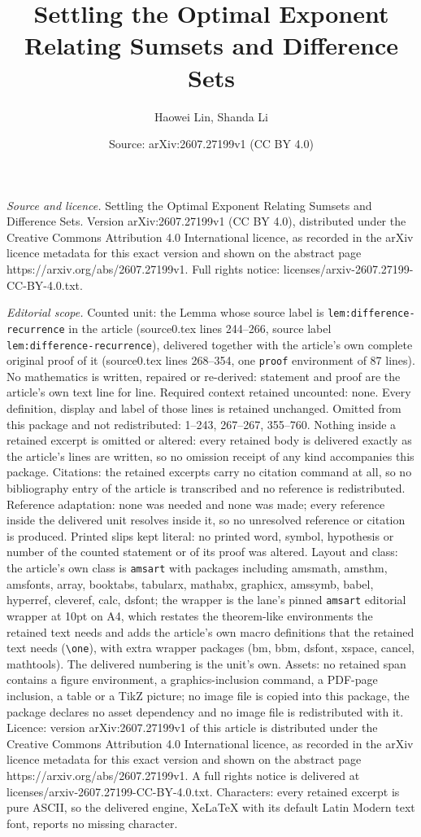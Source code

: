 \documentclass[10pt,a4paper]{amsart}
\title[Settling the Optimal Exponent Relating Sumsets and Differenc]{Settling the Optimal Exponent Relating Sumsets and Difference Sets}
\author{Haowei Lin, Shanda Li}
\date{Source: arXiv:2607.27199v1 (CC BY 4.0)}
\begin{document}
\maketitle

\noindent\emph{Source and licence.} Settling the Optimal Exponent Relating Sumsets and Difference Sets. Version arXiv:2607.27199v1 (CC BY 4.0), distributed under the Creative Commons Attribution 4.0 International licence, as recorded in the arXiv licence metadata for this exact version and shown on the abstract page https://arxiv.org/abs/2607.27199v1. Full rights notice: licenses/arxiv-2607.27199-CC-BY-4.0.txt.\par\smallskip

\noindent\textit{Editorial scope.} Counted unit: the Lemma whose source label is \texttt{lem:difference-recurrence} in the article (source0.tex lines 244--266, source label \texttt{lem:difference-recurrence}), delivered together with the article's own complete original proof of it (source0.tex lines 268--354, one \texttt{proof} environment of 87 lines). No mathematics is written, repaired or re-derived: statement and proof are the article's own text line for line. Required context retained uncounted: none. Every definition, display and label of those lines is retained unchanged. Omitted from this package and not redistributed: 1--243, 267--267, 355--760. Nothing inside a retained excerpt is omitted or altered: every retained body is delivered exactly as the article's lines are written, so no omission receipt of any kind accompanies this package. Citations: the retained excerpts carry no citation command at all, so no bibliography entry of the article is transcribed and no reference is redistributed. Reference adaptation: none was needed and none was made; every reference inside the delivered unit resolves inside it, so no unresolved reference or citation is produced. Printed slips kept literal: no printed word, symbol, hypothesis or number of the counted statement or of its proof was altered. Layout and class: the article's own class is \texttt{amsart} with packages including amsmath, amsthm, amsfonts, array, booktabs, tabularx, mathabx, graphicx, amssymb, babel, hyperref, cleveref, calc, dsfont; the wrapper is the lane's pinned \texttt{amsart} editorial wrapper at 10pt on A4, which restates the theorem-like environments the retained text needs and adds the article's own macro definitions that the retained text needs (\texttt{\textbackslash one}), with extra wrapper packages (bm, bbm, dsfont, xspace, cancel, mathtools). The delivered numbering is the unit's own. Assets: no retained span contains a figure environment, a graphics-inclusion command, a PDF-page inclusion, a table or a TikZ picture; no image file is copied into this package, the package declares no asset dependency and no image file is redistributed with it. Licence: version arXiv:2607.27199v1 of this article is distributed under the Creative Commons Attribution 4.0 International licence, as recorded in the arXiv licence metadata for this exact version and shown on the abstract page https://arxiv.org/abs/2607.27199v1. A full rights notice is delivered at licenses/arxiv-2607.27199-CC-BY-4.0.txt. Characters: every retained excerpt is pure ASCII, so the delivered engine, XeLaTeX with its default Latin Modern text font, reports no missing character.
\end{document}
